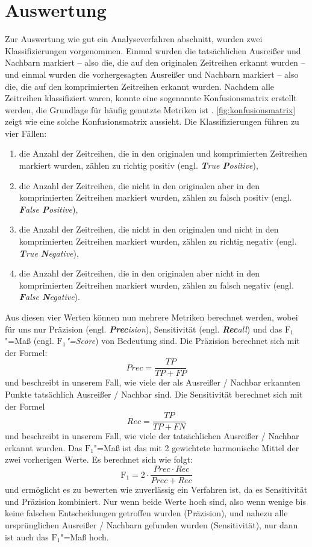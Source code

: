 \section{Auswertung}\label{sec:auswertung}
\newcommand{\tikztextc}[3]{\node at (#1, #2) {\vphantom{/}\smash{#3}};}
\newcommand{\tikztextupc}[3]{\node at (#1, #2) [rotate = 90] {\vphantom{/}\smash{#3}};}
Zur Auswertung wie gut ein Analyseverfahren abschnitt, wurden zwei Klassifizierungen vorgenommen. Einmal wurden die tatsächlichen Ausreißer und Nachbarn markiert -- also die, die auf den originalen Zeitreihen erkannt wurden -- und einmal wurden die vorhergesagten Ausreißer und Nachbarn markiert -- also die, die auf den komprimierten Zeitreihen erkannt wurden. Nachdem alle Zeitreihen klassifiziert waren, konnte eine sogenannte Konfusionsmatrix erstellt werden, die Grundlage für häufig genutzte Metriken ist \cite{konfusionsmatrix}. \autoref{fig:konfusionsmatrix} zeigt wie eine solche Konfusionsmatrix aussieht. Die Klassifizierungen führen zu vier Fällen: \begin{enumerate}
    \item die Anzahl der Zeitreihen, die in den originalen und komprimierten Zeitreihen markiert wurden, zählen zu richtig positiv (engl. \textit{\textbf{T}rue \textbf{P}ositive}),
    \item die Anzahl der Zeitreihen, die nicht in den originalen aber in den komprimierten Zeitreihen markiert wurden, zählen zu falsch positiv (engl. \textit{\textbf{F}alse \textbf{P}ositive}),
    \item die Anzahl der Zeitreihen, die nicht in den originalen und nicht in den komprimierten Zeitreihen markiert wurden, zählen zu richtig negativ (engl. \textit{\textbf{T}rue \textbf{N}egative}),
    \item die Anzahl der Zeitreihen, die in den originalen aber nicht in den komprimierten Zeitreihen markiert wurden, zählen zu falsch negativ (engl. \textit{\textbf{F}alse \textbf{N}egative}).
\end{enumerate} 
Aus diesen vier Werten können nun mehrere Metriken berechnet werden, wobei für uns nur Präzision (engl. \textit{\textbf{Prec}ision}), Sensitivität (engl. \textit{\textbf{Rec}all}) und das $\text{F}_1$"=Maß (engl. \textit{$\text{F}_1$"=Score}) von Bedeutung sind. Die Präzision berechnet sich mit der Formel: \[Prec = \frac{TP}{TP + FP}\]
und beschreibt in unserem Fall, wie viele der als Ausreißer / Nachbar erkannten Punkte tatsächlich Ausreißer / Nachbar sind. Die Sensitivität berechnet sich mit der Formel \[Rec = \frac{TP}{TP + FN}\] und beschreibt in unserem Fall, wie viele der tatsächlichen Ausreißer / Nachbar erkannt wurden. Das $\text{F}_1$"=Maß ist das mit 2 gewichtete harmonische Mittel der zwei vorherigen Werte. Es berechnet sich wie folgt: \[\text{F}_1=2\cdot\frac{Prec \cdot Rec}{Prec + Rec}\] und ermöglicht es zu bewerten wie zuverlässig ein Verfahren ist, da es Sensitivität und Präzision kombiniert. Nur wenn beide Werte hoch sind, also wenn wenige bis keine falschen Entscheidungen getroffen wurden (Präzision), und nahezu alle ursprünglichen Ausreißer / Nachbarn gefunden wurden (Sensitivität), nur dann ist auch das $\text{F}_1$"=Maß hoch.
